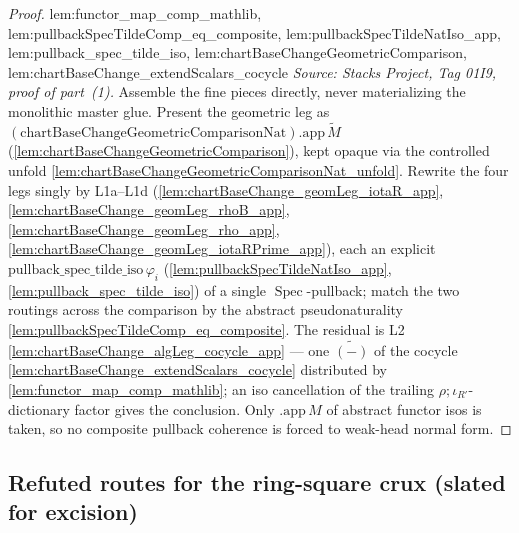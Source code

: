 \begin{lemma}
\begin{proof}
{          lem:functor_map_comp_mathlib, lem:pullbackSpecTildeComp_eq_composite,
          lem:pullbackSpecTildeNatIso_app, lem:pullback_spec_tilde_iso,
          lem:chartBaseChangeGeometricComparison, lem:chartBaseChange_extendScalars_cocycle}
    \textit{Source: Stacks Project, Tag 01I9, proof of part~(1).}
    Assemble the fine pieces directly, never materializing the monolithic master glue. Present the
    geometric leg as \((\mathrm{chartBaseChangeGeometricComparisonNat}).\mathrm{app}\,\widetilde M\)
    (\cref{lem:chartBaseChangeGeometricComparison}), kept opaque via the controlled unfold
    \cref{lem:chartBaseChangeGeometricComparisonNat_unfold}. Rewrite the four legs singly by L1a--L1d
    (\cref{lem:chartBaseChange_geomLeg_iotaR_app}, \cref{lem:chartBaseChange_geomLeg_rhoB_app},
    \cref{lem:chartBaseChange_geomLeg_rho_app}, \cref{lem:chartBaseChange_geomLeg_iotaRPrime_app}), each
    an explicit \(\mathrm{pullback\_spec\_tilde\_iso}\,\varphi_i\) (\cref{lem:pullbackSpecTildeNatIso_app},
    \cref{lem:pullback_spec_tilde_iso}) of a single \(\operatorname{Spec}\)-pullback; match the two
    routings across the comparison by the abstract pseudonaturality
    \cref{lem:pullbackSpecTildeComp_eq_composite}. The residual is L2
    \cref{lem:chartBaseChange_algLeg_cocycle_app} — one \(\widetilde{(-)}\) of the cocycle
    \cref{lem:chartBaseChange_extendScalars_cocycle} distributed by
    \cref{lem:functor_map_comp_mathlib}; an iso cancellation of the trailing
    \(\rho;\iota_{R'}\)-dictionary factor gives the conclusion. Only \(\mathrm{.app}\,M\) of abstract
    functor isos is taken, so no composite pullback coherence is forced to weak-head normal form.
  \end{proof}
\end{lemma}

\subsection{Refuted routes for the ring-square crux (slated for excision)}

